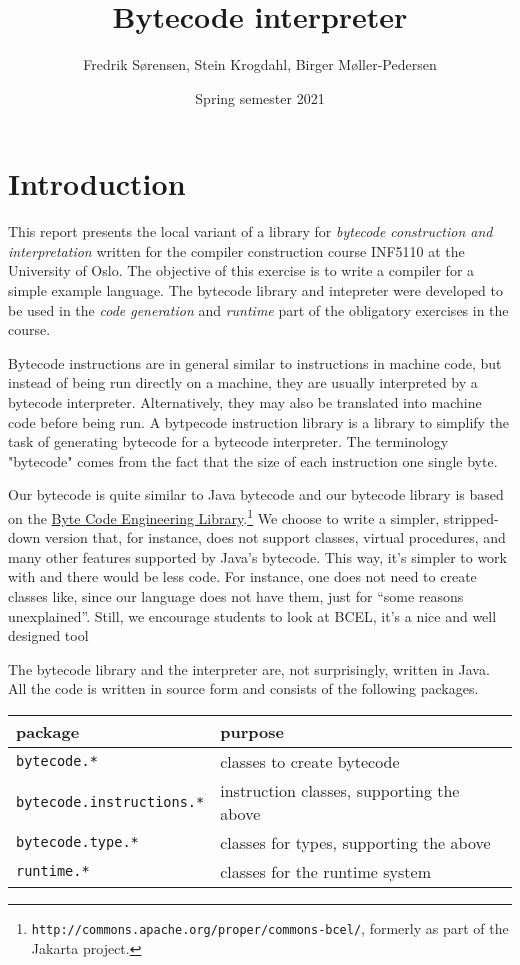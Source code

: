 \documentclass[11pt]{article}
\author{Fredrik Sørensen, Stein Krogdahl, Birger Møller-Pedersen}
\date{Spring semester 2021}
\title{Bytecode interpreter}
\begin{document}
\maketitle
\tableofcontents


\section{Introduction}
\label{sec:org53621b7}

This report presents the local variant of a library for \emph{bytecode
construction and interpretation} written for the compiler construction
course INF5110 at the University of Oslo.  The objective of this exercise
is to write a compiler for a simple example language. The bytecode library
and intepreter were developed to be used in the \emph{code generation} and
\emph{runtime} part of the obligatory exercises in the course.


Bytecode instructions are in general similar to instructions in machine
code, but instead of being run directly on a machine, they are usually
interpreted by a bytecode interpreter. Alternatively, they may also be
translated into machine code before being run. A bytpecode instruction
library is a library to simplify the task of generating bytecode for a
bytecode interpreter. The terminology "bytecode" comes from the fact that
the size of each instruction one single byte.

Our bytecode is quite similar to Java bytecode and our bytecode library is
based on the \href{http://commons.apache.org/proper/commons-bcel/}{Byte Code Engineering Library}.\footnote{\texttt{http://commons.apache.org/proper/commons-bcel/}, formerly as
part of the Jakarta project.} We choose to write a
simpler, stripped-down version that, for instance, does not support
classes, virtual procedures, and many other features supported by Java's
bytecode.  This way, it's simpler to work with and there would be less
code. For instance, one does not need to create classes like, since our
language does not have them, just for ``some reasons unexplained''. Still,
we encourage students to look at BCEL, it's a nice and well designed tool



The bytecode library and the interpreter are, not surprisingly, written in
Java. All the code is written in source form and consists of the following
packages.


\begin{center}
\begin{tabular}{ll}
\hline
package & purpose\\
\hline
\texttt{bytecode.*} & classes to create bytecode\\
\texttt{bytecode.instructions.*} & instruction classes, supporting the above\\
\texttt{bytecode.type.*} & classes for types, supporting the above\\
\texttt{runtime.*} & classes for the runtime system\\
\hline
\end{tabular}

\end{center}
\end{document}
